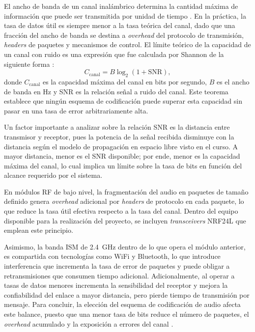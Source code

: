 El ancho de banda de un canal inalámbrico determina la cantidad máxima de información que puede ser transmitida por unidad de tiempo \cite{pohlmann2005}.
En la práctica, la tasa de datos útil es siempre menor a la tasa teórica del canal, dado que una fracción del ancho de banda se destina a \textit{overhead} del protocolo de transmisión, \textit{headers} de paquetes y mecanismos de control.
El límite teórico de la capacidad de un canal con ruido es una expresión que fue calculada por Shannon de la siguiente forma \cite{tanenbaum2011}:
\begin{equation}
    C_{\text{canal}} = B \log_2\left(1 + \text{SNR}\right),
\end{equation}
donde $C_{\text{canal}}$ es la capacidad máxima del canal en bits por segundo, $B$ es el ancho de banda en \si{\hertz} y SNR es la relación señal a ruido del canal.
Este teorema establece que ningún esquema de codificación puede superar esta capacidad sin pasar en una tasa de error arbitrariamente alta.

Un factor importante a analizar sobre la relación SNR es la distancia entre transmisor y receptor, pues la potencia de la señal recibida disminuye con la distancia según el modelo de propagación en espacio libre visto en el curso.
A mayor distancia, menor es el SNR disponible; por ende, menor es la capacidad máxima del canal, lo cual implica un límite sobre la tasa de bits en función del alcance requerido por el sistema.

En módulos RF de bajo nivel, la fragmentación del audio en paquetes de tamaño definido genera \textit{overhead} adicional por \textit{headers} de protocolo en cada paquete, lo que reduce la tasa útil efectiva respecto a la tasa del canal.
Dentro del equipo disponible para la realización del proyecto, se incluyen \textit{transceivers} NRF24L que emplean este principio.

Asimismo, la banda ISM de \SI{2.4}{\giga\hertz} dentro de lo que opera el módulo anterior, es compartida con tecnologías como WiFi y Bluetooth, lo que introduce interferencia que incrementa la tasa de error de paquetes y puede obligar a retransmisiones que consumen tiempo adicional.
Adicionalmente, al operar a tasas de datos menores incrementa la sensibilidad del receptor y mejora la confiabilidad del enlace a mayor distancia, pero pierde tiempo de transmisión por mensaje.
Para concluir, la elección del esquema de codificación de audio afecta este balance, puesto que una menor tasa de bits reduce el número de paquetes, el \textit{overhead} acumulado y la exposición a errores del canal \cite{pohlmann2005}.
